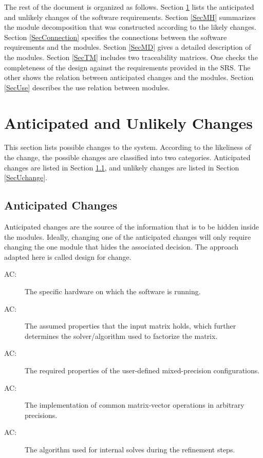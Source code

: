 \documentclass[12pt, titlepage]{article}
\newcounter{acnum}
\newcommand{\actheacnum}{AC\theacnum}
\begin{document}
The rest of the document is organized as follows. Section
\ref{SecChange} lists the anticipated and unlikely changes of the software
requirements. Section \ref{SecMH} summarizes the module decomposition that
was constructed according to the likely changes. Section \ref{SecConnection}
specifies the connections between the software requirements and the
modules. Section \ref{SecMD} gives a detailed description of the
modules. Section \ref{SecTM} includes two traceability matrices. One checks
the completeness of the design against the requirements provided in the SRS. The
other shows the relation between anticipated changes and the modules. Section
\ref{SecUse} describes the use relation between modules.

\section{Anticipated and Unlikely Changes} \label{SecChange}

This section lists possible changes to the system. According to the likeliness
of the change, the possible changes are classified into two
categories. Anticipated changes are listed in Section \ref{SecAchange}, and
unlikely changes are listed in Section \ref{SecUchange}.

\subsection{Anticipated Changes} \label{SecAchange}

Anticipated changes are the source of the information that is to be hidden
inside the modules. Ideally, changing one of the anticipated changes will only
require changing the one module that hides the associated decision. The approach
adapted here is called design for change.

\begin{description}
\item[ \actheacnum \label{AC:hw}:] The specific hardware on
  which the software is running.
\item[ \actheacnum \label{AC:factor}:] The assumed properties
  that the input matrix holds, which further determines the solver/algorithm
  used to factorize the matrix.
\item[ \actheacnum \label{AC:concepts}:] The required
  properties of the user-defined mixed-precision configurations.
\item[ \actheacnum \label{AC:ops}:] The implementation of
  common matrix-vector operations in arbitrary precisions.
\item[ \actheacnum \label{AC:solve}:] The algorithm used for
  internal solves during the refinement steps.
\end{description}
\end{document}

